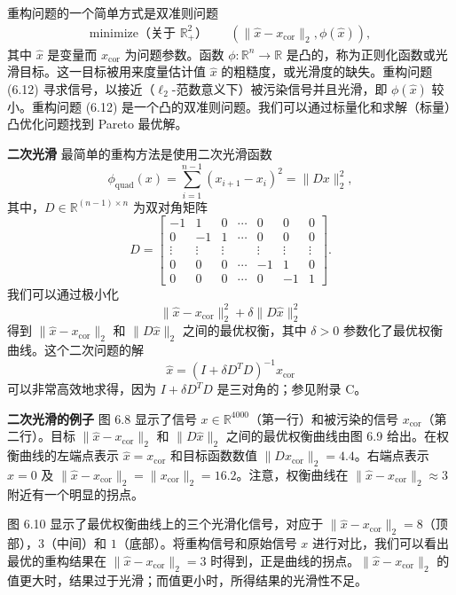 \documentclass[UTF8,12pt,a4paper,fontset=fandol]{ctexart}
\begin{document}
重构问题的一个简单方式是双准则问题
\begin{equation}
\begin{aligned}
\text{minimize（关于 $\mathbb{R}_+^2$）}\quad & (\|\hat{x}-x_{\mathrm{cor}}\|_2,\phi(\hat{x})),
\end{aligned}
\tag{6.12}
\end{equation}
其中 $\hat{x}$ 是变量而 $x_{\mathrm{cor}}$ 为问题参数。函数 $\phi:\mathbb{R}^n\to\mathbb{R}$ 是凸的，称为正则化函数或光滑目标。这一目标被用来度量估计值 $\hat{x}$ 的粗糙度，或光滑度的缺失。重构问题 (6.12) 寻求信号，以接近（$\ell_2$-范数意义下）被污染信号并且光滑，即 $\phi(\hat{x})$ 较小。重构问题 (6.12) 是一个凸的双准则问题。我们可以通过标量化和求解（标量）凸优化问题找到 Pareto 最优解。

\noindent\textbf{二次光滑}\quad
最简单的重构方法是使用二次光滑函数
\[
\phi_{\mathrm{quad}}(x)=\sum_{i=1}^{n-1}(x_{i+1}-x_i)^2=\|Dx\|_2^2,
\]
其中，$D\in\mathbb{R}^{(n-1)\times n}$ 为双对角矩阵
\[
D=
\begin{bmatrix}
-1 & 1 & 0 & \cdots & 0 & 0 & 0\\
0 & -1 & 1 & \cdots & 0 & 0 & 0\\
\vdots & \vdots & \vdots & & \vdots & \vdots & \vdots\\
0 & 0 & 0 & \cdots & -1 & 1 & 0\\
0 & 0 & 0 & \cdots & 0 & -1 & 1
\end{bmatrix}.
\]
我们可以通过极小化
\[
\|\hat{x}-x_{\mathrm{cor}}\|_2^2+\delta\|D\hat{x}\|_2^2
\]
得到 $\|\hat{x}-x_{\mathrm{cor}}\|_2$ 和 $\|D\hat{x}\|_2$ 之间的最优权衡，其中 $\delta>0$ 参数化了最优权衡曲线。这个二次问题的解
\[
\hat{x}=(I+\delta D^T D)^{-1}x_{\mathrm{cor}}
\]
可以非常高效地求得，因为 $I+\delta D^TD$ 是三对角的；参见附录 C。

\noindent\textbf{二次光滑的例子}\quad
图 6.8 显示了信号 $x\in\mathbb{R}^{4000}$（第一行）和被污染的信号 $x_{\mathrm{cor}}$（第二行）。目标 $\|\hat{x}-x_{\mathrm{cor}}\|_2$ 和 $\|D\hat{x}\|_2$ 之间的最优权衡曲线由图 6.9 给出。在权衡曲线的左端点表示 $\hat{x}=x_{\mathrm{cor}}$ 和目标函数数值 $\|Dx_{\mathrm{cor}}\|_2=4.4$。右端点表示 $\hat{x}=0$ 及 $\|\hat{x}-x_{\mathrm{cor}}\|_2=\|x_{\mathrm{cor}}\|_2=16.2$。注意，权衡曲线在 $\|\hat{x}-x_{\mathrm{cor}}\|_2\approx 3$ 附近有一个明显的拐点。

图 6.10 显示了最优权衡曲线上的三个光滑化信号，对应于 $\|\hat{x}-x_{\mathrm{cor}}\|_2=8$（顶部），$3$（中间）和 $1$（底部）。将重构信号和原始信号 $x$ 进行对比，我们可以看出最优的重构结果在 $\|\hat{x}-x_{\mathrm{cor}}\|_2=3$ 时得到，正是曲线的拐点。$\|\hat{x}-x_{\mathrm{cor}}\|_2$ 的值更大时，结果过于光滑；而值更小时，所得结果的光滑性不足。
\end{document}
